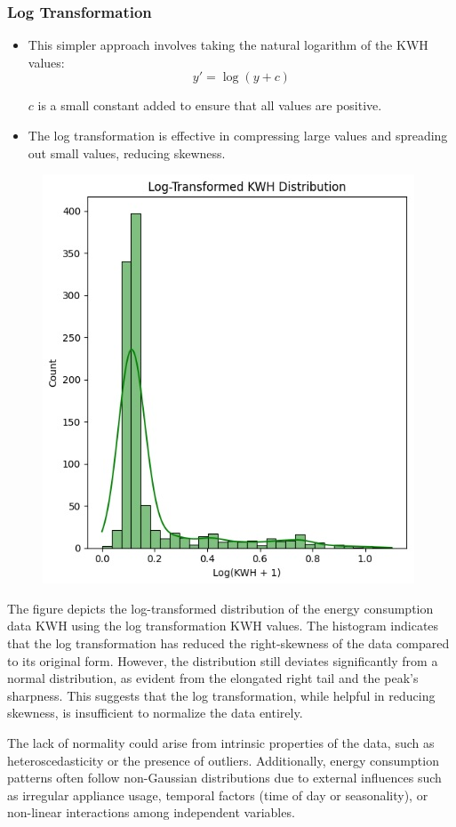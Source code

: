 \documentclass[english,12pt, titlepage]{article}
\begin{document}
	\subsubsection{Log Transformation}
	\begin{itemize}
		\item This simpler approach involves taking the natural logarithm of the KWH values:
		\begin{equation*}
			y' = \log(y + c)
		\end{equation*}
		
		
		$c$ is a small constant added to ensure that all values are positive.
		
		\item The log transformation is effective in compressing large values and spreading out small values, reducing skewness.
	\end{itemize}
	
	
	\begin{figure}[!ht]
		\centering
		\includegraphics[width=0.5\linewidth]{fig3.jpg}
		\label{fig4}
	\end{figure}  
	The figure depicts the log-transformed distribution of the energy consumption data KWH using the log transformation 
	KWH values. The histogram indicates that the log transformation has reduced the right-skewness of the data compared to its original form. However, the distribution still deviates significantly from a normal distribution, as evident from the elongated right tail and the peak's sharpness. This suggests that the log transformation, while helpful in reducing skewness, is insufficient to normalize the data entirely.
	
	The lack of normality could arise from intrinsic properties of the data, such as heteroscedasticity or the presence of outliers. Additionally, energy consumption patterns often follow non-Gaussian distributions due to external influences such as irregular appliance usage, temporal factors (time of day or seasonality), or non-linear interactions among independent variables.
	
\end{document}
